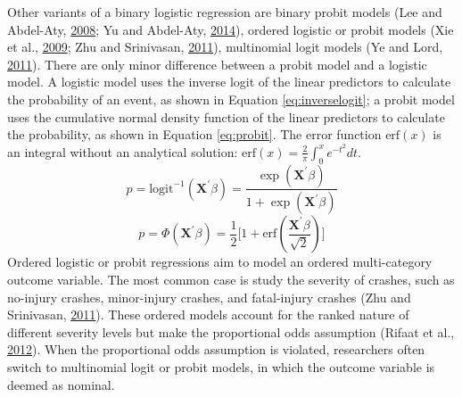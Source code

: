 \documentclass[12pt]{book}
\numberwithin{equation}{chapter}
\begin{document}
Other variants of a binary logistic regression are binary probit models (Lee and Abdel-Aty, \protect\hyperlink{ref-lee2008presence}{2008}; Yu and Abdel-Aty, \protect\hyperlink{ref-yu2014using}{2014}), ordered logistic or probit models (Xie et al., \protect\hyperlink{ref-xie2009crash}{2009}; Zhu and Srinivasan, \protect\hyperlink{ref-zhu2011comprehensive}{2011}), multinomial logit models (Ye and Lord, \protect\hyperlink{ref-ye2011investigation}{2011}). There are only minor difference between a probit model and a logistic model. A logistic model uses the inverse logit of the linear predictors to calculate the probability of an event, as shown in Equation \eqref{eq:inverselogit}; a probit model uses the cumulative normal density function of the linear predictors to calculate the probability, as shown in Equation \eqref{eq:probit}. The error function \(\text{erf}(x)\) is an integral without an analytical solution: \(\text{erf}(x) = \frac{2}{\pi}\int_0^xe^{-t^2}dt\).
\begin{equation}
p = \text{logit}^{-1}(\mathbf{X}^\prime\beta) = \frac{\exp (\mathbf{X}^\prime\beta)}{1 + \exp (\mathbf{X}^\prime\beta)}
\label{eq:inverselogit}
\end{equation}
\begin{equation}
p = \Phi(\mathbf{X}^\prime\beta) = \frac{1}{2}\Big[1+\text{erf}(\frac{\mathbf{X}^\prime\beta}{\sqrt 2})\Big]
\label{eq:probit}
\end{equation}
Ordered logistic or probit regressions aim to model an ordered multi-category outcome variable. The most common case is study the severity of crashes, such as no-injury crashes, minor-injury crashes, and fatal-injury crashes (Zhu and Srinivasan, \protect\hyperlink{ref-zhu2011comprehensive}{2011}). These ordered models account for the ranked nature of different severity levels but make the proportional odds assumption (Rifaat et al., \protect\hyperlink{ref-rifaat2012severity}{2012}). When the proportional odds assumption is violated, researchers often switch to multinomial logit or probit models, in which the outcome variable is deemed as nominal.
\end{document}

